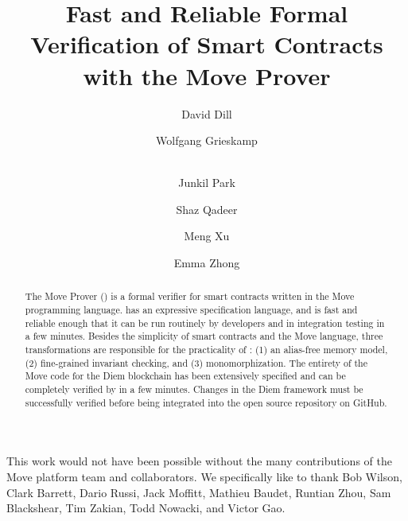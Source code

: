 \documentclass[runningheads]{llncs}
\begin{document}
\author{
  David Dill \and Wolfgang Grieskamp \and \\ Junkil
  Park \and Shaz Qadeer \and Meng Xu
  \and Emma Zhong
}


\title{Fast and Reliable Formal Verification of Smart Contracts with the Move Prover}

\maketitle
\begin{abstract}
  The Move Prover (\MVP) is a formal verifier for smart contracts
  written in the Move programming language. \MVP has an expressive
  specification language, and is fast and reliable enough that it can
  be run routinely by developers and in integration testing in a few
  minutes. Besides the simplicity of smart contracts and the Move
  language, three transformations are responsible for the practicality
  of \MVP: (1) an alias-free memory model, (2) fine-grained invariant
  checking, and (3) monomorphization.  The entirety of the Move code for
  the Diem blockchain has been extensively specified and can be
  completely verified by \MVP in a few minutes. Changes in the Diem
  framework must be successfully verified before being integrated into
  the open source repository on GitHub.
\end{abstract}








\vspace{-0.5ex}

This work would not have been possible without the many contributions of the
Move platform team and collaborators.  We specifically like to thank Bob Wilson,
Clark Barrett, Dario Russi, Jack Moffitt, Mathieu Baudet, Runtian Zhou, Sam
Blackshear, Tim Zakian, Todd Nowacki, and Victor Gao.




\appendix
\newpage

\newpage

\end{document}

